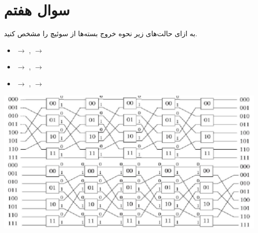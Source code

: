 \section{سوال هفتم}

به ازای حالت‌های زیر نحوه خروج بسته‌ها از سوئیچ را مشخص کنید.

\begin{latin}
	\begin{itemize}
		\item[\lr{A)}]  $\rightarrow$ ,  $\rightarrow$ 
		\item[\lr{B)}]  $\rightarrow$ ,  $\rightarrow$ 
		\item[\lr{C)}]  $\rightarrow$ ,  $\rightarrow$ 
	\end{itemize}
\end{latin}


\begin{center}
	\includegraphics*[width=1\linewidth]{pics/img4.png}
	\label{شکل مورد نظر}
\end{center}